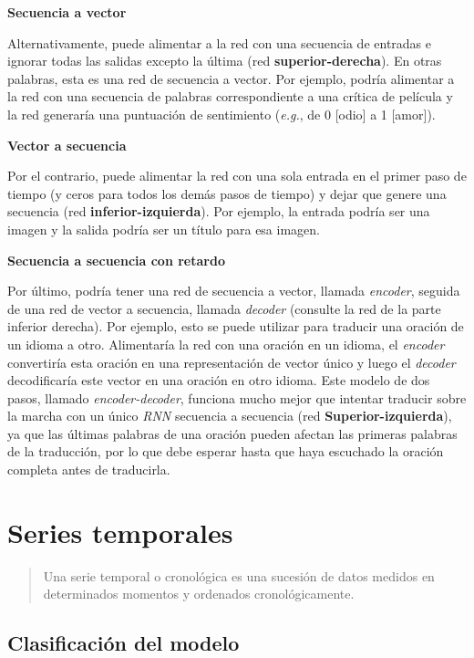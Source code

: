 \documentclass[a4paper,12pt]{article}
\begin{document}
\textbf{Secuencia a vector}

Alternativamente, puede alimentar a la red con una secuencia de entradas e ignorar todas las salidas excepto la última (red \textbf{superior-derecha}). En otras palabras, esta es una red de secuencia a vector. Por ejemplo, podría alimentar a la red con una secuencia de palabras correspondiente a una crítica de película y la red generaría una puntuación de sentimiento (\textit{e.g.}, de 0 [odio] a 1 [amor]).

\textbf{Vector a secuencia}

Por el contrario, puede alimentar la red con una sola entrada en el primer paso de tiempo (y ceros para todos los demás pasos de tiempo) y dejar que genere una secuencia (red \textbf{inferior-izquierda}). Por ejemplo, la entrada podría ser una imagen y la salida podría ser un título para esa imagen.

\textbf{Secuencia a secuencia con retardo}

Por último, podría tener una red de secuencia a vector, llamada \textit{encoder}, seguida de una red de vector a secuencia, llamada \textit{decoder} (consulte la red de la parte inferior derecha). Por ejemplo, esto se puede utilizar para traducir una oración de un idioma a otro. Alimentaría la red con una oración en un idioma, el \textit{encoder} convertiría esta oración en una representación de vector único y luego el \textit{decoder} decodificaría este vector en una oración en otro idioma. Este modelo de dos pasos, llamado \textit{encoder-decoder}, funciona mucho mejor que intentar traducir sobre la marcha con un único \textit{RNN} secuencia a secuencia (red \textbf{Superior-izquierda}), ya que las últimas palabras de una oración pueden afectan las primeras palabras de la traducción, por lo que debe esperar hasta que haya escuchado la oración completa antes de traducirla.

\section{Series temporales}

\begin{quote}
  Una serie temporal o cronológica es una sucesión de datos medidos en determinados momentos y ordenados cronológicamente.
  
  \hfill \citet{poole1998}
\end{quote}

\subsection{Clasificación del modelo}
\end{document}
